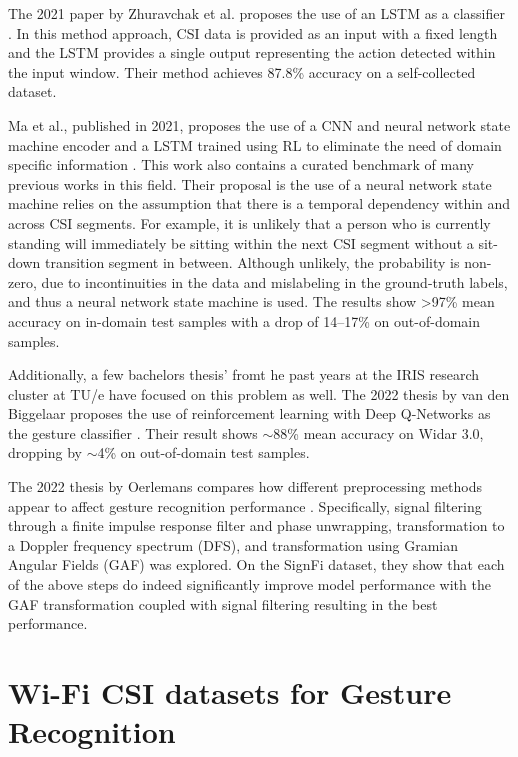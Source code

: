 The 2021 paper by Zhuravchak et al. proposes the use of an LSTM as a classifier \cite{zhuravchak2022human}. 
In this method approach, CSI data is provided as an input with a fixed length and the LSTM provides a single output representing the action detected within the input window.
Their method achieves 87.8\% accuracy on a self-collected dataset.

Ma et al., published in 2021, proposes the use of a CNN and neural network state machine encoder and a LSTM trained using RL to eliminate the need of domain specific information \cite{ma2021location}.
This work also contains a curated benchmark of many previous works in this field.
Their proposal is the use of a neural network state machine relies on the assumption that there is a temporal dependency within and across CSI segments.
For example, it is unlikely that a person who is currently standing will immediately be sitting within the next CSI segment without a sit-down transition segment in between.
Although unlikely, the probability is non-zero, due to incontinuities in the data and mislabeling in the ground-truth labels, and thus a neural network state machine is used.
The results show >97\% mean accuracy on in-domain test samples with a drop of 14--17\% on out-of-domain samples.

Additionally, a few bachelors thesis' fromt he past years at the IRIS research cluster at TU/e have focused on this problem as well.
The 2022 thesis by van den Biggelaar proposes the use of reinforcement learning with Deep Q-Networks as the gesture classifier \cite{biggelaar2022gesture}.
Their result shows $\sim$88\% mean accuracy on Widar 3.0, dropping by $\sim$4\% on out-of-domain test samples.

The 2022 thesis by Oerlemans compares how different preprocessing methods appear to affect gesture recognition performance \cite{oerlemans2022effect}.
Specifically, signal filtering through a finite impulse response filter and phase unwrapping, transformation to a Doppler frequency spectrum (DFS), and transformation using Gramian Angular Fields (GAF) was explored.
On the SignFi dataset, they show that each of the above steps do indeed significantly improve model performance with the GAF transformation coupled with signal filtering resulting in the best performance.

\section{Wi-Fi CSI datasets for Gesture Recognition}

